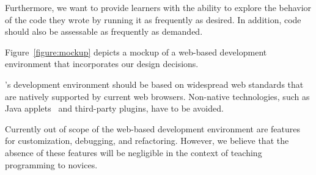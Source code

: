 Furthermore, we want to provide learners with the ability to explore the behavior of the code they wrote by running it as frequently as desired. In addition, code should also be assessable as frequently as demanded.

Figure~\ref{figure:mockup} depicts a mockup of a web-based development environment that incorporates our design decisions.

\tool's development environment should be based on widespread web standards that are natively supported by current web browsers. Non-native technologies, such as Java applets~\cite{truong2005learning} and third-party plugins, have to be avoided.

Currently out of scope of the web-based development environment are features for customization, debugging, and refactoring. However, we believe that the absence of these features will be negligible in the context of teaching programming to novices.
